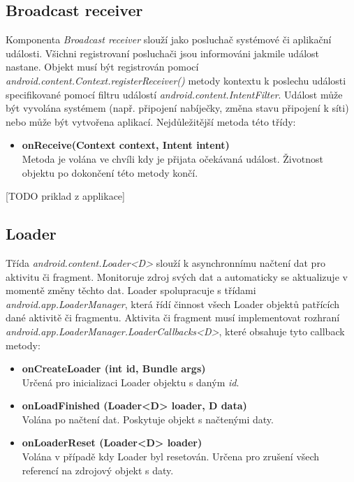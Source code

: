\documentclass{diplomka}
\begin{document}
\subsection{Broadcast receiver}
Komponenta \emph{Broadcast receiver} slouží jako posluchač systémové či aplikační události. Všichni registrovaní posluchači jsou informováni jakmile událost nastane. Objekt musí být registrován pomocí \emph{android.content.Context.registerReceiver()} metody kontextu k poslechu události specifikované pomocí filtru událostí \emph{android.content.IntentFilter}. Událost může být vyvolána systémem (např. připojení nabíječky, změna stavu připojení k síti) nebo může být vytvořena aplikací. Nejdůležitější metoda této třídy:
\begin{itemize}[]
\item \textbf{onReceive(Context context, Intent intent)}\\
Metoda je volána ve chvíli kdy je přijata očekávaná událost. Životnost objektu po dokončení této metody končí.
\end{itemize}
[TODO priklad z applikace]
\subsection{Loader}
Třída \emph{android.content.Loader<D>} slouží k asynchronnímu načtení dat pro aktivitu či fragment. Monitoruje zdroj svých dat a automaticky se aktualizuje v momentě změny těchto dat. Loader spolupracuje s třídami \emph{	android.app.LoaderManager}, která řídí činnost všech Loader objektů patřících dané aktivitě či fragmentu. Aktivita či fragment musí implementovat rozhraní \emph{android.app.LoaderManager.LoaderCallbacks<D>}, které obsahuje tyto callback metody:

\begin{itemize}[]
\item \textbf{onCreateLoader (int id, Bundle args)}\\
Určená pro inicializaci Loader objektu s daným \emph{id}.
\item \textbf{onLoadFinished (Loader<D> loader, D data)}\\
Volána po načtení dat. Poskytuje objekt s načtenými daty.
\item \textbf{onLoaderReset (Loader<D> loader)}\\
Volána v případě kdy Loader byl resetován. Určena pro zrušení všech referencí na zdrojový objekt s daty.
\end{itemize}
\end{document}

